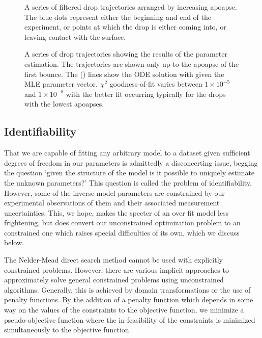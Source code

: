 \documentclass[12pt,a4paper,oneside]{book}
\begin{document}
\begin{figure}[h]
    \centering
    \resizebox{\textwidth}{!}{}
    \caption{A series of filtered drop trajectories arranged by increasing apoapse. The blue dots represent either the beginning and end of the experiment, or points at which the drop is either coming into, or leaving contact with the surface.}
    \label{fig:trajectories}
\end{figure}
\begin{figure}[h]
    \centering
    \resizebox{\textwidth}{!}{}
    \caption{A series of drop trajectories showing the results of the parameter estimation. The trajectories are shown only up to the apoapse of the first bounce. The (\protect\redline) \hspace{0.25 mm} lines show the ODE solution with given the MLE parameter vector. $\chi^2$ goodness-of-fit varies between $1 \times 10^{-5}$ and $1 \times 10^{-8}$ with the better fit occurring typically for the drops with the lowest apoapses.}
    \label{fig:inverse_problem}
\end{figure}

\subsection{Identifiability}
That we are capable of fitting any arbitrary model to a dataset given sufficient degrees of freedom in our parameters is admittedly a disconcerting issue, begging the question `given the structure of the model is it possible to uniquely estimate the unknown parameters?' This question is called the problem of identifiability. However, some of the inverse model parameters are constrained by our experimental observations of them and their associated measurement uncertainties. This, we hope, makes the specter of an over fit model less frightening, but does convert our unconstrained optimization problem to an constrained one which raises special difficulties of its own, which we discuss below. 

The Nelder-Mead direct search method cannot be used with explicitly constrained problems. However, there are various implicit approaches to approximately solve general constrained problems using unconstrained algorithms. Generally, this is achieved by domain transformations or the use of penalty functions.  By the addition of a penalty function which depends in some way on the values of the constraints to the objective function, we minimize a pseudo-objective function where the in-feasibility of the constraints is minimized simultaneously to the objective function. 
\end{document}
